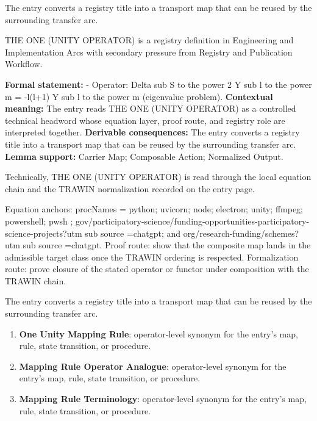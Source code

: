 The entry converts a registry title into a transport map that can be reused by the surrounding transfer arc.
\clearpage


\begingroup\small
{}
THE ONE (UNITY OPERATOR) is a registry definition in Engineering and Implementation Arcs with secondary pressure from Registry and Publication Workflow.

\begingroup\footnotesize\setlength{\emergencystretch}{3em}\sloppy
\textbf{Formal statement:} - Operator: Delta sub S to the power 2 Y sub l to the power m = -l(l+1) Y sub l to the power m (eigenvalue problem). \textbf{Contextual meaning:} The entry reads THE ONE (UNITY OPERATOR) as a controlled technical headword whose equation layer, proof route, and registry role are interpreted together. \textbf{Derivable consequences:} The entry converts a registry title into a transport map that can be reused by the surrounding transfer arc. \textbf{Lemma support:} Carrier Map; Composable Action; Normalized Output.\par
\endgroup

Technically, THE ONE (UNITY OPERATOR) is read through the local equation chain and the TRAWIN normalization recorded on the entry page.

Equation anchors: procNames = python; uvicorn; node; electron; unity; ffmpeg; powershell; pwsh ; gov/participatory-science/funding-opportunities-participatory-science-projects?utm sub source =chatgpt; and org/research-funding/schemes?utm sub source =chatgpt. Proof route: show that the composite map lands in the admissible target class once the TRAWIN ordering is respected. Formalization route: prove closure of the stated operator or functor under composition with the TRAWIN chain.

The entry converts a registry title into a transport map that can be reused by the surrounding transfer arc.
\endgroup

\begin{enumerate}[leftmargin=1.6em,itemsep=6pt,topsep=4pt]
\item \textbf{One Unity Mapping Rule}: operator-level synonym for the entry's map, rule, state transition, or procedure.
\item \textbf{Mapping Rule Operator Analogue}: operator-level synonym for the entry's map, rule, state transition, or procedure.
\item \textbf{Mapping Rule Terminology}: operator-level synonym for the entry's map, rule, state transition, or procedure.
\end{enumerate}

